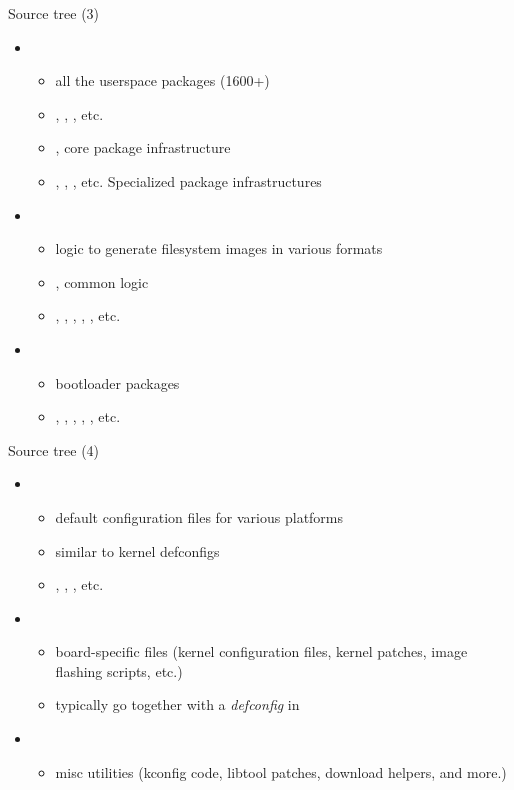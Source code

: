 \begin{frame}{Source tree (3)}
  \begin{itemize}
  \item {}
    \begin{itemize}
    \item all the userspace packages (1600+)
    \item {}, , , etc.
    \item {}, core package infrastructure
    \item {}, ,
      , etc. Specialized package infrastructures
    \end{itemize}
  \item {}
    \begin{itemize}
    \item logic to generate filesystem images in various formats
    \item {}, common logic
    \item {}, , , ,
      , etc.
    \end{itemize}
  \item {}
    \begin{itemize}
    \item bootloader packages
    \item {}, , ,
      , , etc.
    \end{itemize}
  \end{itemize}
\end{frame}

\begin{frame}{Source tree (4)}
  \begin{itemize}
  \item {}
    \begin{itemize}
    \item default configuration files for various platforms
    \item similar to kernel defconfigs
    \item {},
      , , etc.
    \end{itemize}
  \item {}
    \begin{itemize}
    \item board-specific files (kernel configuration files, kernel
      patches, image flashing scripts, etc.)
    \item typically go together with a {\em defconfig} in
    \end{itemize}
  \item {}
    \begin{itemize}
    \item misc utilities (kconfig code, libtool patches, download
      helpers, and more.)
    \end{itemize}
  \end{itemize}
\end{frame}

